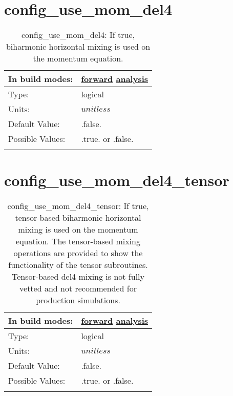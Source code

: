 \section[config\_use\_mom\_del4]{config\_use\_mom\_del4}
\label{sec:nm_sec_config_use_mom_del4}
\begin{center}
\begin{longtable}{| p{2.0in} || p{4.0in} |}
    \hline
    In build modes: & \hyperref[subsec:forward_nm_tab_hmix_del4]{forward} \hyperref[subsec:analysis_nm_tab_hmix_del4]{analysis} \\
    \hline
    Type: & logical \\
    \hline
    Units: & $unitless$ \\
    \hline
    Default Value: & .false. \\
    \hline
    Possible Values: & .true. or .false. \\
    \hline
    \caption{config\_use\_mom\_del4: If true, biharmonic horizontal mixing is used on the momentum equation.}
\end{longtable}
\end{center}
\section[config\_use\_mom\_del4\_tensor]{config\_use\_mom\_del4\_tensor}
\label{sec:nm_sec_config_use_mom_del4_tensor}
\begin{center}
\begin{longtable}{| p{2.0in} || p{4.0in} |}
    \hline
    In build modes: & \hyperref[subsec:forward_nm_tab_hmix_del4_tensor]{forward} \hyperref[subsec:analysis_nm_tab_hmix_del4_tensor]{analysis} \\
    \hline
    Type: & logical \\
    \hline
    Units: & $unitless$ \\
    \hline
    Default Value: & .false. \\
    \hline
    Possible Values: & .true. or .false. \\
    \hline
    \caption{config\_use\_mom\_del4\_tensor: If true, tensor-based biharmonic horizontal mixing is used on the momentum equation.  The tensor-based mixing operations are provided to show the functionality of the tensor subroutines.  Tensor-based del4 mixing is not fully vetted and not recommended for production simulations.}
\end{longtable}
\end{center}
